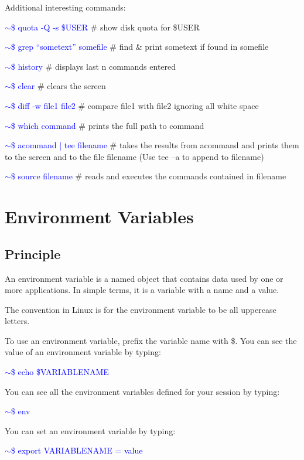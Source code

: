 \documentclass{beamer}[10pt, usepdftitle=false, handout]
\newcommand*{\blue}{\textcolor{blue}}
\begin{document}
	\begin{frame}
	
	Additional interesting commands:
	\vspace*{1em}
	
\blue{$\sim$\$ quota ‐Q ‐s \$USER} \# show disk quota for \$USER

\blue{$\sim$\$ grep “sometext” somefile} \# find \& print sometext if found in somefile

\blue{$\sim$\$ history} \# displays last n commands entered

\blue{$\sim$\$ clear} \# clears the screen

\blue{$\sim$\$ diff ‐w file1 file2} \# compare file1 with file2 ignoring all white space

\blue{$\sim$\$ which command} \# prints the full path to command

\blue{$\sim$\$ acommand | tee filename} \# takes the results from acommand and prints them to the screen and to the file filename (Use tee –a to append to filename)

\blue{$\sim$\$ source filename} \# reads and executes the commands contained in filename


\end{frame}

\section{Environment Variables}
\subsection{Principle}
\begin{frame}

An environment variable is a named object that contains data used by
one or more applications. In simple terms, it is a variable with a name
and a value.
\vspace*{0.5em}

The convention in Linux is for the environment variable to be all
uppercase letters.
\vspace*{0.5em}

To use an environment variable, prefix the variable name with \$.
You can see the value of an environment variable by typing:
\vspace*{1em}

\blue{$\sim$\$ echo \$VARIABLENAME}
\vspace*{1em}

You can see all the environment variables defined for your session by typing:
\vspace*{0.5em} 

\blue{$\sim$\$ env}
\vspace*{0.5em} 

You can set an environment variable by typing:

\blue{$\sim$\$ export VARIABLENAME = value}


\end{frame}
\end{document}
